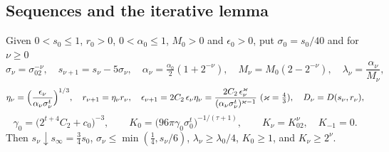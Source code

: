 \subsection{Sequences and the iterative lemma}\label{bpW:w6:iter-sec}

\begin{definition}\label{bpW:w6:sequences}
Given $0<s_0\le1$, $r_0>0$, $0<\alpha_0\le1$, $M_0>0$ and $\epsilon_0>0$, put $\sigma_0=s_0/40$ and for $\nu\ge0$
\[\sigma_\nu=\sigma_02^{-\nu},\quad s_{\nu+1}=s_\nu-5\sigma_\nu,\quad\alpha_\nu=\tfrac{\alpha_0}2(1+2^{-\nu}),\quad
M_\nu=M_0(2-2^{-\nu}),\quad\lambda_\nu=\frac{\alpha_\nu}{M_\nu},\]
\[\eta_\nu=\Bigl(\frac{\epsilon_\nu}{\alpha_\nu\sigma_\nu^t}\Bigr)^{1/3},\quad r_{\nu+1}=\eta_\nu r_\nu,\quad
\epsilon_{\nu+1}=2C_2\,\epsilon_\nu\eta_\nu=\frac{2C_2\,\epsilon_\nu^{\varkappa}}{(\alpha_\nu\sigma_\nu^t)^{\varkappa-1}}\ (\varkappa=\tfrac43),\quad
D_\nu=D(s_\nu,r_\nu),\]
\[\gamma_0=\bigl(2^{t+4}C_2+c_0\bigr)^{-3},\qquad K_0=\bigl(96\pi\gamma_0\sigma_0^t\bigr)^{-1/(\tau+1)},\qquad K_\nu=K_02^\nu,\quad K_{-1}=0.\]
Then $s_\nu\downarrow s_\infty=\frac34s_0$, $\sigma_\nu\le\min(\frac14,s_\nu/6)$, $\lambda_\nu\ge\lambda_0/4$, $K_0\ge1$, and
$K_\nu\ge2^\nu$.
\end{definition}

